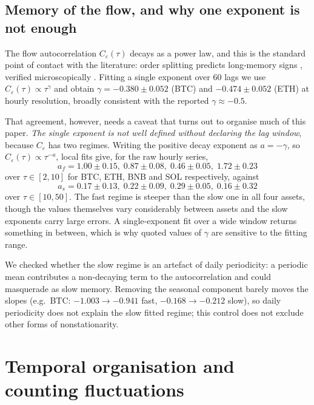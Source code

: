 \documentclass[aps,pre,twocolumn,superscriptaddress,floatfix,nofootinbib]{revtex4-2}
\newcommand{\eps}{\varepsilon}
\begin{document}
\subsection{Memory of the flow, and why one exponent is not enough}
\label{sec:acf}

The flow autocorrelation $C_\eps(\tau)$ decays as a power law, and this is the
standard point of contact with the literature: order splitting predicts
long-memory signs \cite{lillo2005}, verified microscopically
\cite{sato2023prl,sato2023prr}. Fitting a single exponent over $60$ lags we
use $C_\eps(\tau)\propto\tau^\gamma$ and obtain
$\gamma = -0.380 \pm 0.052$ (BTC) and $-0.474 \pm 0.052$ (ETH) at hourly
resolution, broadly consistent with the reported $\gamma\approx-0.5$.

That agreement, however, needs a caveat that turns out to organise much of this
paper. \emph{The single exponent is not well defined without declaring the lag
window}, because $C_\eps$ has two regimes. Writing the positive decay exponent
as $a=-\gamma$, so $C_\eps(\tau)\propto\tau^{-a}$, local fits give, for the raw
hourly series,
\begin{equation}
  a_f = 1.00\pm0.15,\; 0.87\pm0.08,\; 0.46\pm0.05,\; 1.72\pm0.23
\end{equation}
over $\tau\in[2,10]$ for BTC, ETH, BNB and SOL respectively, against
\begin{equation}
  a_s = 0.17\pm0.13,\; 0.22\pm0.09,\; 0.29\pm0.05,\; 0.16\pm0.32
\end{equation}
over $\tau\in[10,50]$. The fast regime is steeper than the slow one in all four
assets, though the values themselves vary considerably between assets and the
slow exponents carry large errors. A single-exponent fit over a wide window
returns something in between, which is why quoted values of $\gamma$ are
sensitive to the fitting range.

We checked whether the slow regime is an artefact of daily periodicity: a
periodic mean contributes a
non-decaying term to the autocorrelation and could masquerade as slow memory.
Removing the seasonal component barely moves the slopes (e.g.\ BTC:
$-1.003\to-0.941$ fast, $-0.168\to-0.212$ slow), so daily periodicity does not
explain the slow fitted regime; this control does not exclude other forms of
nonstationarity.

\section{Temporal organisation and counting fluctuations}
\label{sec:counting}
\end{document}
